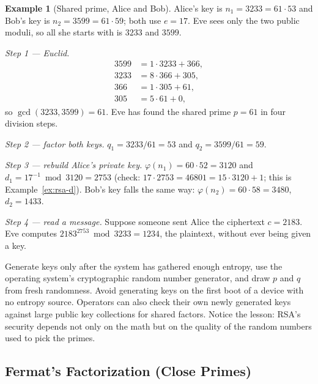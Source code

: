 \documentclass[11pt]{article}
\theoremstyle{definition}
\newtheorem{example}[theorem]{Example}
\theoremstyle{remark}
\begin{document}
\begin{example}[Shared prime, Alice and Bob]\label{ex:sharedprime}
Alice's key is $n_1=3233=61\cdot53$ and Bob's key is $n_2=3599=61\cdot59$; both use $e=17$. Eve sees only the two public moduli, so all she starts with is $3233$ and $3599$.

\emph{Step 1 --- Euclid.}
\begin{align*}
3599 &= 1\cdot3233+366,\\
3233 &= 8\cdot366+305,\\
366 &= 1\cdot305+61,\\
305 &= 5\cdot61+0,
\end{align*}
so $\gcd(3233,3599)=61$. Eve has found the shared prime $p=61$ in four division steps.

\emph{Step 2 --- factor both keys.} $q_1=3233/61=53$ and $q_2=3599/61=59$.

\emph{Step 3 --- rebuild Alice's private key.} $\varphi(n_1)=60\cdot52=3120$ and $d_1=17^{-1}\bmod3120=2753$ (check: $17\cdot2753=46801=15\cdot3120+1$; this is Example~\ref{ex:rsa-d}). Bob's key falls the same way: $\varphi(n_2)=60\cdot58=3480$, $d_2=1433$.

\emph{Step 4 --- read a message.} Suppose someone sent Alice the ciphertext $c=2183$. Eve computes $2183^{2753}\bmod3233=1234$, the plaintext, without ever being given a key.
\end{example}

\begin{fixbox}
Generate keys only after the system has gathered enough entropy, use the operating system's cryptographic random number generator, and draw $p$ and $q$ from fresh randomness. Avoid generating keys on the first boot of a device with no entropy source. Operators can also check their own newly generated keys against large public key collections for shared factors. Notice the lesson: RSA's security depends not only on the math but on the quality of the random numbers used to pick the primes.
\end{fixbox}

\subsection{Fermat's Factorization (Close Primes)}\label{sec:fermat}
\end{document}
